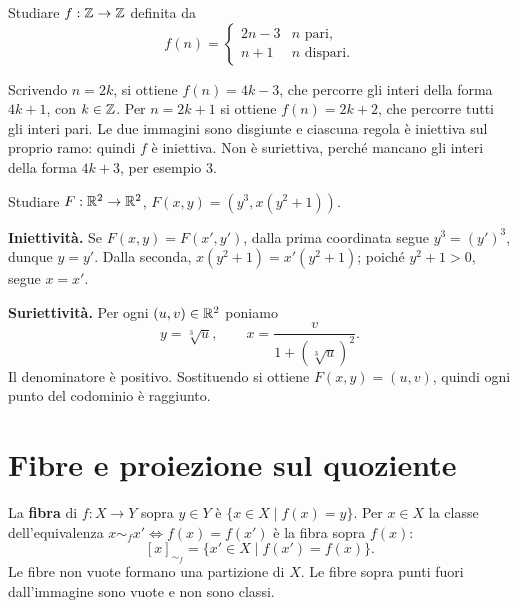 \begin{esercizio}
Studiare $f:\mathbb{Z}\to\mathbb{Z}$ definita da
\[
f(n)=\begin{cases}2n-3&n\text{ pari},\\n+1&n\text{ dispari}.\end{cases}
\]
\end{esercizio}
\begin{svolgimento}
Scrivendo $n=2k$, si ottiene $f(n)=4k-3$, che percorre gli interi della forma $4k+1$, con $k\in\mathbb{Z}$. Per $n=2k+1$ si ottiene $f(n)=2k+2$, che percorre tutti gli interi pari. Le due immagini sono disgiunte e ciascuna regola è iniettiva sul proprio ramo: quindi $f$ è iniettiva. Non è suriettiva, perché mancano gli interi della forma $4k+3$, per esempio $3$.
\end{svolgimento}

\begin{esercizio}
Studiare $F:\mathbb{R}^2\to\mathbb{R}^2$, $F(x,y)=(y^3,x(y^2+1))$.
\end{esercizio}
\begin{svolgimento}
\textbf{Iniettività.} Se $F(x,y)=F(x',y')$, dalla prima coordinata segue $y^3=(y')^3$, dunque $y=y'$. Dalla seconda, $x(y^2+1)=x'(y^2+1)$; poiché $y^2+1>0$, segue $x=x'$.

\textbf{Suriettività.} Per ogni $(u,v)\in\mathbb{R}^2$ poniamo
\[
y=\sqrt[3]u,\qquad x=\frac{v}{1+(\sqrt[3]u)^2}.
\]
Il denominatore è positivo. Sostituendo si ottiene $F(x,y)=(u,v)$, quindi ogni punto del codominio è raggiunto.
\end{svolgimento}

\section{Fibre e proiezione sul quoziente}
\begin{definizione}
La \textbf{fibra} di $f:X\to Y$ sopra $y\in Y$ è $\{x\in X\mid f(x)=y\}$. Per $x\in X$ la classe dell'equivalenza $x\sim_f x'\iff f(x)=f(x')$ è la fibra sopra $f(x)$:
\[
[x]_{\sim_f}=\{x'\in X\mid f(x')=f(x)\}.
\]
Le fibre non vuote formano una partizione di $X$. Le fibre sopra punti fuori dall'immagine sono vuote e non sono classi.
\end{definizione}

